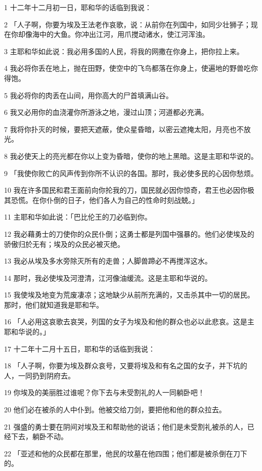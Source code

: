 \par 1 十二年十二月初一日，耶和华的话临到我说：
\par 2 「人子啊，你要为埃及王法老作哀歌，说：从前你在列国中，如同少壮狮子；现在你却像海中的大鱼。你冲出江河，用爪搅动诸水，使江河浑浊。
\par 3 主耶和华如此说：我必用多国的人民，将我的网撒在你身上，把你拉上来。
\par 4 我必将你丢在地上，抛在田野，使空中的飞鸟都落在你身上，使遍地的野兽吃你得饱。
\par 5 我必将你的肉丢在山间，用你高大的尸首填满山谷。
\par 6 我又必用你的血浇灌你所游泳之地，漫过山顶；河道都必充满。
\par 7 我将你扑灭的时候，要把天遮蔽，使众星昏暗，以密云遮掩太阳，月亮也不放光。
\par 8 我必使天上的亮光都在你以上变为昏暗，使你的地上黑暗。这是主耶和华说的。
\par 9 「我使你败亡的风声传到你所不认识的各国。那时，我必使多民的心因你愁烦。
\par 10 我在许多国民和君王面前向你抡我的刀，国民就必因你惊奇，君王也必因你极其恐慌。在你仆倒的日子，他们各人为自己的性命时刻战兢。」
\par 11 主耶和华如此说：「巴比伦王的刀必临到你。
\par 12 我必藉勇士的刀使你的众民仆倒；这勇士都是列国中强暴的。他们必使埃及的骄傲归於无有；埃及的众民必被灭绝。
\par 13 我必从埃及多水旁除灭所有的走兽；人脚兽蹄必不再搅浑这水。
\par 14 那时，我必使埃及河澄清，江河像油缓流。这是主耶和华说的。
\par 15 我使埃及地变为荒废凄凉；这地缺少从前所充满的，又击杀其中一切的居民。那时，他们就知道我是耶和华。
\par 16 「人必用这哀歌去哀哭，列国的女子为埃及和他的群众也必以此悲哀。这是主耶和华说的。」
\par 17 十二年十二月十五日，耶和华的话临到我说：
\par 18 「人子啊，你要为埃及群众哀号，又要将埃及和有名之国的女子，并下坑的人，一同扔到阴府去。
\par 19 你埃及的美丽胜过谁呢？你下去与未受割礼的人一同躺卧吧！
\par 20 他们必在被杀的人中仆到。他被交给刀剑，要把他和他的群众拉去。
\par 21 强盛的勇士要在阴间对埃及王和帮助他的说话；他们是未受割礼被杀的人，已经下去，躺卧不动。
\par 22 「亚述和他的众民都在那里，他民的坟墓在他四围；他们都是被杀倒在刀下的。
